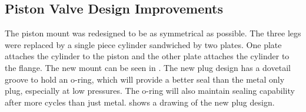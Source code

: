 \subsection{Piston Valve Design Improvements} \label{ss:new valve}
The piston mount was redesigned to be as symmetrical as possible. The three legs were replaced by a single piece cylinder sandwiched by two plates. One plate attaches the cylinder to the piston and the other plate attaches the cylinder to the flange. The new mount can be seen in . The new plug design has a dovetail groove to hold an o-ring, which will provide a better seal than the metal only plug, especially at low pressures. The o-ring will also maintain sealing capability after more cycles than just metal.  shows a drawing of the new plug design.

